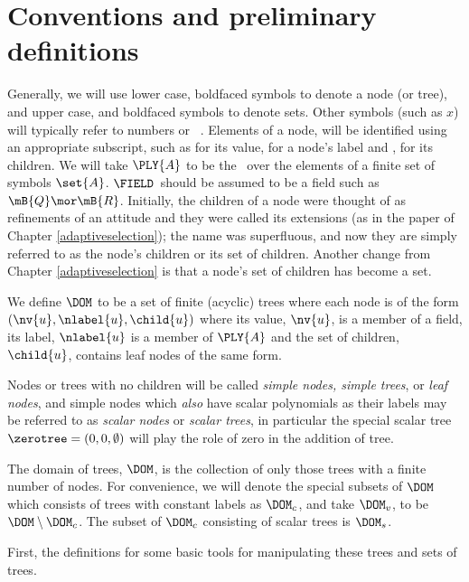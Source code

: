\section{Conventions and preliminary definitions}

Generally, we will use lower case, boldfaced symbols to denote a node
(or tree), and upper case, and boldfaced symbols to denote sets.
Other symbols (such as $x$) will typically refer to numbers or
\polyrat\ \polyforms. Elements of a node,  will be identified
using an appropriate subscript, such as  for its value,
 for a node's label and , for its children. We
will take $\PLY{A}$ to be the \polytypes\ over the elements of a
finite set of symbols $\set{A}$.  $\FIELD$\ should be assumed to be a
field such as $\mB{Q} \mor \mB{R}$.  Initially, the children of a node
were thought of as refinements of an attitude and they were called its
extensions (as in the paper of Chapter \ref{adaptiveselection}); the
name was superfluous, and now they are simply referred to as the node's
children or its set of children.  Another change from Chapter
\ref{adaptiveselection} is that a node's set of children has become a
set.

\begin{definition}\label{def-of-dom}
We define $\DOM$ to be a set of finite (acyclic) trees where each node is of the form
$(\nv{u},\nlabel{u},\child{u})$
where its value, $\nv{u}$, is a member
of a field, its label, \(\nlabel{u}\) is a member of $\PLY{A}$ and
the set of children, $\child{u}$, contains leaf nodes of the same
form. 
\end{definition}

Nodes or trees with no children will be called \emph{simple nodes,
  simple trees}, or \emph{leaf nodes}, and simple nodes which
\emph{also\/} have scalar polynomials as their labels may be referred
to as \emph{scalar nodes} or \emph{scalar trees}, in particular the
special scalar tree $\zerotree = (0, 0, \emptyset)$ will play the role
of zero in the addition of tree.  

The domain of trees,
$\DOM$, is the collection of only those trees with a finite number of
nodes. For convenience, we will denote the special subsets of
$\DOM$ which consists of trees with constant labels as $\DOM_c$, and
take $\DOM_v$, to be $\DOM \setminus \DOM_c$.  The subset of $\DOM_c$
consisting of scalar trees is $\DOM_s$.

First, the definitions for some basic tools for manipulating these
trees and sets of trees.

